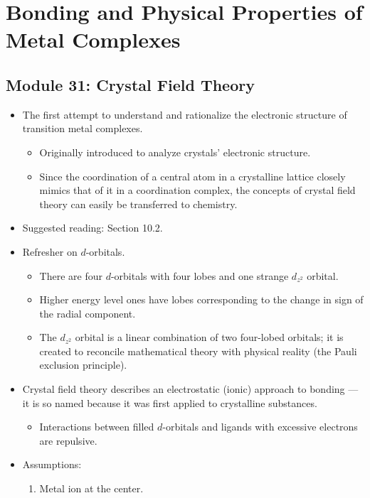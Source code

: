 \documentclass[../notes.tex]{subfiles}
\begin{document}
\chapter{Bonding and Physical Properties of Metal Complexes}
\section{Module 31: Crystal Field Theory}
\begin{itemize}
    \item The first attempt to understand and rationalize the electronic structure of transition metal complexes.
    \begin{itemize}
        \item Originally introduced to analyze crystals' electronic structure.
        \item Since the coordination of a central atom in a crystalline lattice closely mimics that of it in a coordination complex, the concepts of crystal field theory can easily be transferred to chemistry.
    \end{itemize}
    \item Suggested reading: \textcite{bib:MiesslerFischerTarr} Section 10.2.
    \item Refresher on $d$-orbitals.
    \begin{itemize}
        \item There are four $d$-orbitals with four lobes and one strange $d_{z^2}$ orbital.
        \item Higher energy level ones have lobes corresponding to the change in sign of the radial component.
        \item The $d_{z^2}$ orbital is a linear combination of two four-lobed orbitals; it is created to reconcile mathematical theory with physical reality (the Pauli exclusion principle).
    \end{itemize}
    \item Crystal field theory describes an electrostatic (ionic) approach to bonding --- it is so named because it was first applied to crystalline substances.
    \begin{itemize}
        \item Interactions between filled $d$-orbitals and ligands with excessive electrons are repulsive.
    \end{itemize}
    \item Assumptions:
    \begin{enumerate}
        \item Metal ion at the center.

\end{enumerate}
\end{itemize}
\end{document}

